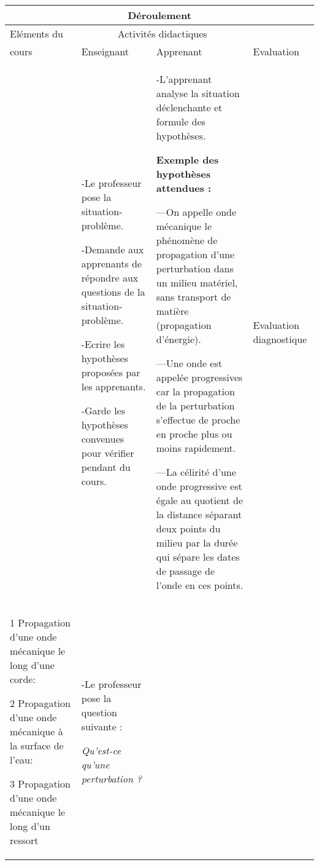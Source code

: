 \documentclass[12pt]{article}
\begin{document}
\begin{center}
	 \begin{tabular}{|p{}||p{}||p{}||p{}|}
\hline
\multicolumn{4}{|c|}{Déroulement}\\\hline
Eléments du & \multicolumn{2}{c||}{Activités didactiques} &  \\\cline{2-3}
cours & Enseignant & Apprenant & Evaluation\\\hline

\color{red}{I-Introduction}	  &
-Le professeur pose la situation-problème.

-Demande aux apprenants de répondre aux questions de la situation-problème.

-Ecrire les hypothèses proposées par les apprenants.

-Garde les hypothèses convenues pour vérifier pendant
du cours.
				  &
				  -L’apprenant analyse la situation déclenchante
et formule des hypothèses.

\textbf{Exemple des hypothèses attendues :}

---On appelle onde mécanique le phénomène
de propagation d’une perturbation dans un
milieu matériel, sans transport de matière
(propagation d’énergie).

---Une onde est appelée progressives car la
propagation de la perturbation s'effectue de
proche en proche plus ou moins rapidement.

---La célirité d'une onde progressive est égale
au quotient de la distance séparant deux
points du milieu par la durée qui sépare les
dates de passage de l'onde en ces points. 
				  &
				  Evaluation
diagnostique\\\hline


\color{red}{II Ondes longitudinales, transversales, et leurs caractéristiques.}

\vspace{0.5cm}
\color{blue}1 Propagation d’une onde mécanique le long d’une corde:
\vspace{0.5cm}

\color{blue}2
Propagation d’une onde mécanique à la surface de l’eau:

\vspace{0.5cm}
\color{blue}3
Propagation d’une onde mécanique le long d’un ressort


				  &
-Le professeur pose la question suivante : 

\emph{Qu’est-ce qu’une perturbation ?}


\end{tabular}
\end{center}
\end{document}
